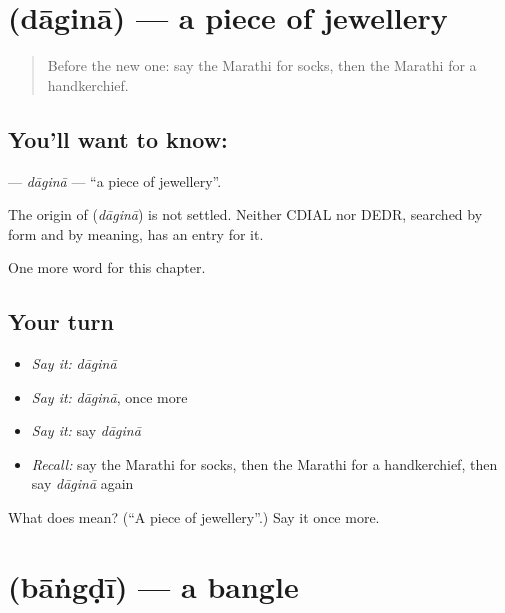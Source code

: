 \section[\texorpdfstring{\mr{दागिना} (dāginā)}{दागिना (dāginā)}]{ (dāginā) — a piece of jewellery}

\label{lesson:MR-C187-dagina}



\begin{quote}
Before the new one: say the Marathi for socks, then the Marathi for a handkerchief.
\end{quote}

\subsection*{You'll want to know: }
\textbf{} — \emph{dāginā} — \textquotedblleft{}a piece of jewellery\textquotedblright{}.

\begin{cousinweb}
The origin of \textbf{} (\emph{dāginā}) is not settled. Neither CDIAL nor DEDR, searched by form and by meaning, has an entry for it.
\end{cousinweb}

\begin{grammarlens}[title={What you've built}]
One more word for this chapter.
\end{grammarlens}

\subsection*{Your turn}
\begin{itemize}
\raggedright
  \item \emph{Say it:} \emph{dāginā}
  \item \emph{Say it:} \emph{dāginā}, once more
  \item \emph{Say it:} say \emph{dāginā}
  \item \emph{Recall:} say the Marathi for socks, then the Marathi for a handkerchief, then say \emph{dāginā} again
\end{itemize}

\begin{tcolorbox}[breakable,colback=teal!4,colframe=teal!35!black,title={Before you move on}]
What does  mean? (\textquotedblleft{}A piece of jewellery\textquotedblright{}.) Say it once more.
\end{tcolorbox}
\section[\texorpdfstring{\mr{बांगडी} (bāṅgḍī)}{बांगडी (bāṅgḍī)}]{ (bāṅgḍī) — a bangle}

